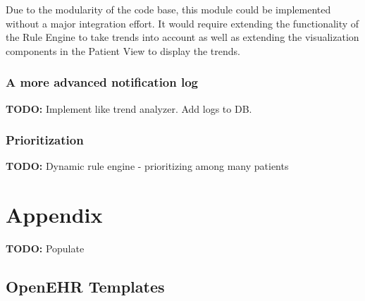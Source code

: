 \documentclass{article}
\begin{document}
Due to the modularity of the code base, this module could be implemented without a major integration effort. It would require extending the functionality of the Rule Engine to take trends into account as well as extending the visualization components in the Patient View to display the trends.




\subsubsection{A more advanced notification log}
\textbf{TODO:} Implement like trend analyzer. Add logs to DB.

\subsubsection{Prioritization}\label{future-prioritization}
\textbf{TODO:} Dynamic rule engine - prioritizing among many patients


\section{Appendix}
\textbf{TODO:} Populate
\subsection{OpenEHR Templates}
\end{document}
